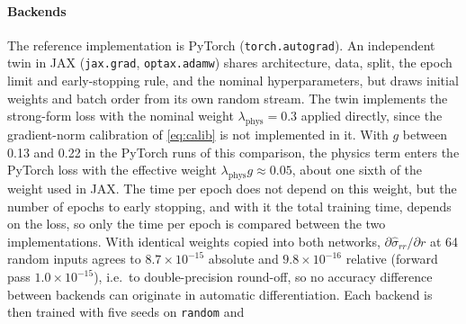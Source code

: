 \documentclass[subscriptcorrection,upint,varvw,barcolor=Goldenrod3,mathalfa=cal=euler,balance,hyphenate,french,pdf-a]{asmejour} %
\begin{document}
\paragraph{Backends}
The reference implementation is PyTorch (\texttt{torch.autograd}). An independent
twin in JAX (\texttt{jax.grad}, \texttt{optax.adamw}) shares architecture, data,
split, the epoch limit and early-stopping rule, and the nominal hyperparameters,
but draws initial weights and batch order from its own random stream.
The twin implements the strong-form loss with the nominal weight
$\lambda_{\mathrm{phys}}=0.3$ applied directly, since the gradient-norm calibration of
\eqref{eq:calib} is not implemented in it. With $g$ between 0.13 and 0.22 in the
PyTorch runs of this comparison, the physics term enters the PyTorch loss with the
effective weight $\lambda_{\mathrm{phys}}g\approx0.05$, about one sixth of the weight used in JAX.
The time per epoch does not depend on this weight, but the number of epochs to early
stopping, and with it the total training time, depends on the loss, so only the time
per epoch is compared between the two implementations.
With identical weights copied into both networks, $\partial\hat\sigma_{rr}/\partial r$
at 64 random inputs agrees to $8.7\times10^{-15}$ absolute and $9.8\times10^{-16}$
relative (forward pass $1.0\times10^{-15}$), i.e.\ to double-precision round-off,
so no accuracy difference between backends can originate in automatic
differentiation.
Each backend is then trained with five seeds on \texttt{random} and
\end{document}
